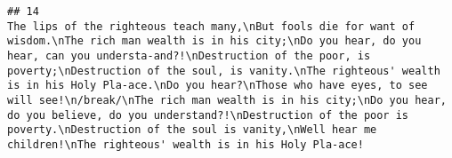 \documentclass[]{article}
\begin{document}
\begin{verbatim}
## 14                                                                                                                                                                                                                                                                                                                                                                                                                                                                                                                                                                                                                                                                                                                                                                                                                                                                                                                                                                                                                                                                                                                                                                                                                                                                                                                                                                                                                                                                                                                                                                                                                                                                                                                                                                                                                                                                                                                                                                                                                                                                                                                                                                                                                                                                                                                                                                                                                                                                                                                                            The lips of the righteous teach many,\nBut fools die for want of wisdom.\nThe rich man wealth is in his city;\nDo you hear, do you hear, can you understa-and?!\nDestruction of the poor, is poverty;\nDestruction of the soul, is vanity.\nThe righteous' wealth is in his Holy Pla-ace.\nDo you hear?\nThose who have eyes, to see will see!\n/break/\nThe rich man wealth is in his city;\nDo you hear, do you believe, do you understand?!\nDestruction of the poor is poverty.\nDestruction of the soul is vanity,\nWell hear me children!\nThe righteous' wealth is in his Holy Pla-ace!

\end{verbatim}
\end{document}
